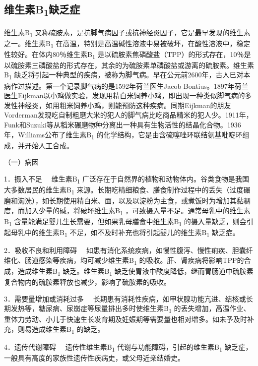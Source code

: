 \subsection{维生素B\textsubscript{1}缺乏症}

维生素B\textsubscript{1}
又称硫胺素，是抗脚气病因子或抗神经炎因子，它是最早发现的维生素之一。维生素B\textsubscript{1}
在高温，特别是高温碱性溶液中易被破坏，在酸性溶液中，稳定性较好。在体内80％维生素B\textsubscript{1}
是以硫胺素焦磷酸盐（TPP）的形式存在，10％是以硫胺素三磷酸盐的形式存在，其余的为硫胺素单磷酸盐或游离的硫胺素。维生素B\textsubscript{1}
缺乏将引起一种典型的疾病，被称为脚气病。早在公元前2600年，古人已对本病作过描述。第一个记录脚气病的是1592年荷兰医生Jacob
Bontius。1897年荷兰医生Eijkman以小鸡做实验，发现用精白米饲养小鸡，即出现一种类似脚气病的多发性神经炎，如用粗米饲养小鸡，则能预防这种疾病。同期Eijkman的朋友Vorderman发现吃自制粗磨大米的犯人的脚气病比吃商品精米的犯人少。1911年，Funk和Suzuki等从稻米碾磨物种分离出一种具有生物活性的结晶化合物。1936年，Williams公布了维生素B\textsubscript{1}
的化学结构，它是由含硫噻唑环联结氨基吡啶环组成，并开始人工合成。

（一）病因

{1．摄入不足} 　维生素B\textsubscript{1}
广泛存在于自然界的植物和动物体内。谷类食物是我国大多数居民的维生素B\textsubscript{1}
来源。长期吃精细粮食、膳食制作过程中的丢失（过度碾磨和淘洗），如长期使用精白米、面，以及以淀粉为主食，或煮饭时为增加其黏稠度，而加入少量的碱，将破坏维生素B\textsubscript{1}
，可致摄入量不足。通常母乳中的维生素B\textsubscript{1}
含量能满足婴儿生长需要，但如果乳母膳食中维生素B\textsubscript{1}
的摄入量缺乏，则会引起母乳中的维生素B\textsubscript{1}
不足，如不及时补充也将引起婴儿的维生素B\textsubscript{1} 缺乏症。

{2．吸收不良和利用障碍}
　如患有消化系统疾病，如慢性腹泻、慢性痢疾、胆囊纤维化、肠道感染等疾病，均可减少维生素B\textsubscript{1}
的吸收。肝、肾疾病将影响TPP的合成，造成维生素B\textsubscript{1}
缺乏。维生素B\textsubscript{1}
缺乏使胃液中酸度降低，继而胃肠道中硫胺素复合物内的硫胺素释放也减少，影响了硫胺素的吸收。

{3．需要量增加或消耗过多}
　长期患有消耗性疾病，如甲状腺功能亢进、结核或长期发热等，糖尿病、尿崩症等尿量排出多时使维生素B\textsubscript{1}
的丢失增加，高温作业、重体力劳动、小儿于快速生长发育期及妊娠期等需要量也相对增多。如未予及时补充，则易造成维生素B\textsubscript{1}
的缺乏。

{4．遗传代谢障碍} 　遗传性维生素B\textsubscript{1}
代谢与功能障碍，引起的维生素B\textsubscript{1}
缺乏症，一般具有高度的家族性遗传性疾病史，或父母近亲结婚史。

